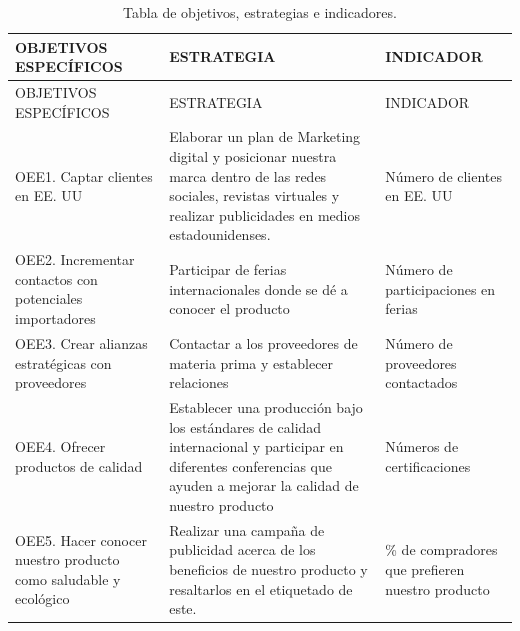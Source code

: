 \documentclass[
  stu,
  floatsintext,
  longtable,
  a4paper,
  nolmodern,
  notxfonts,
  notimes,
  colorlinks=true,linkcolor=blue,citecolor=blue,urlcolor=blue]{apa7}
\begin{document}
\begin{longtable}[]{@{}
  >{\raggedright\arraybackslash}p{}
  >{\raggedright\arraybackslash}p{}
  >{\raggedright\arraybackslash}p{}@{}}
\caption{Tabla de objetivos, estrategias e indicadores.}\tabularnewline
\toprule\noalign{}
\begin{minipage}[b]{\linewidth}\raggedright
OBJETIVOS ESPECÍFICOS
\end{minipage} & \begin{minipage}[b]{\linewidth}\raggedright
ESTRATEGIA
\end{minipage} & \begin{minipage}[b]{\linewidth}\raggedright
INDICADOR
\end{minipage} \\
\midrule\noalign{}
\endfirsthead
\toprule\noalign{}
\begin{minipage}[b]{\linewidth}\raggedright
OBJETIVOS ESPECÍFICOS
\end{minipage} & \begin{minipage}[b]{\linewidth}\raggedright
ESTRATEGIA
\end{minipage} & \begin{minipage}[b]{\linewidth}\raggedright
INDICADOR
\end{minipage} \\
\midrule\noalign{}
\endhead
\bottomrule\noalign{}
\endlastfoot
OEE1. Captar clientes en EE. UU & Elaborar un plan de Marketing digital
y posicionar nuestra marca dentro de las redes sociales, revistas
virtuales y realizar publicidades en medios estadounidenses. & Número de
clientes en EE. UU \\
OEE2. Incrementar contactos con potenciales importadores & Participar de
ferias internacionales donde se dé a conocer el producto & Número de
participaciones en ferias \\
OEE3. Crear alianzas estratégicas con proveedores & Contactar a los
proveedores de materia prima y establecer relaciones & Número de
proveedores contactados \\
OEE4. Ofrecer productos de calidad & Establecer una producción bajo los
estándares de calidad internacional y participar en diferentes
conferencias que ayuden a mejorar la calidad de nuestro producto &
Números de certificaciones \\
OEE5. Hacer conocer nuestro producto como saludable y ecológico &
Realizar una campaña de publicidad acerca de los beneficios de nuestro
producto y resaltarlos en el etiquetado de este. & \% de compradores que
prefieren nuestro producto \\
\end{longtable}
\end{document}

